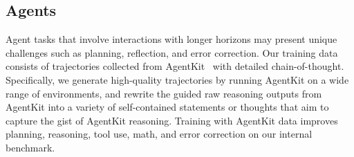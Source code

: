 \documentclass[11pt]{article}
\begin{document}
\subsection{Agents}
Agent tasks that involve interactions with longer horizons may present unique challenges such as planning, reflection, and error correction.
Our training data consists of trajectories collected from AgentKit~\citep{agentkit} with detailed chain-of-thought.
Specifically, we generate high-quality trajectories by running AgentKit on a wide range of environments, and rewrite the guided raw reasoning outputs from AgentKit into a variety of self-contained statements or thoughts that aim to capture the gist of AgentKit reasoning. Training with AgentKit data improves planning, reasoning, tool use, math, and error correction on our internal benchmark.
\end{document}
